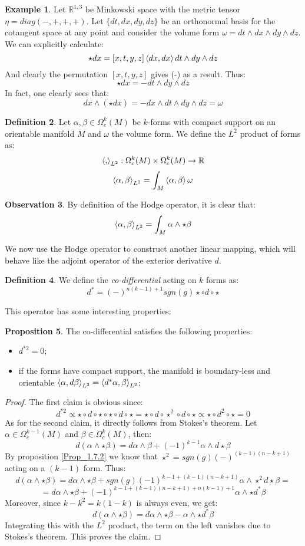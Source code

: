 \documentclass[12pt,a4paper]{report}
\theoremstyle{definition}
\newtheorem{Def}{Definition}[chapter]
\theoremstyle{Theorem}
\newtheorem{Prop}[Def]{Proposition}
\theoremstyle{definition}
\newtheorem{Ex}[Def]{Example}
\theoremstyle{definition}
\newtheorem{Obs}[Def]{Observation}
\begin{document}
	\begin{Ex}
		Let $\mathbb{R}^{1,3}$ be Minkowski space with the metric tensor $\eta=diag(-,+,+,+)$. Let $\{dt,dx,dy,dz\}$ be an orthonormal basis for the cotangent space at any point and consider the volume form $\omega=dt\wedge dx\wedge dy\wedge dz$. We can explicitly calculate:
		$$\star dx=[x,t,y,z]\braket{dx,dx}dt\wedge dy\wedge dz$$
		And clearly the permutation $[x,t,y,z]$ gives (-) as a result. Thus:
		$$\star dx=-dt\wedge dy\wedge dz$$
		In fact, one clearly sees that:
		$$dx\wedge (\star dx)=-dx\wedge dt\wedge dy\wedge dz=\omega$$
	\end{Ex}
	\begin{Def}\label{Def_1.10.2}
		Let $\alpha,\beta\in\Omega^k_c(M)$ be $k$-forms with compact support on an orientable manifold $M$ and $\omega$ the volume form. We define the $L^2$ product of forms as:
		$$\braket{,}_{L^2}:\Omega^k_c(M)\times \Omega^k_c(M)\rightarrow \mathbb{R}$$
		$$\braket{\alpha,\beta}_{L^2}=\int_M\braket{\alpha,\beta}\omega$$
	\end{Def}
	\begin{Obs}
		By definition of the Hodge operator, it is clear that:
		$$\braket{\alpha,\beta}_{L^2}=\int_M\alpha\wedge\star\beta$$
	\end{Obs}
	We now use the Hodge operator to construct another linear mapping, which will behave like the adjoint operator of the exterior derivative $d$.
	\begin{Def}
		We define the \textit{co-differential} acting on $k$ forms as:
		$$d^*=(-)^{n(k-1)+1}sgn(g)\star \circ  d\circ\star$$
	\end{Def}
	This operator has some interesting properties:
	\begin{Prop}
		The co-differential satisfies the following properties:
		\begin{itemize}
			\item $d^{*2}=0$;
			\item if the forms have compact support, the manifold is boundary-less and orientable $\braket{\alpha,d\beta}_{L^2}=\braket{d^*\alpha,\beta}_{L^2}$;
		\end{itemize}
	\end{Prop}
	\begin{proof}
		The first claim is obvious since:
		$$d^{*2}\propto\star \circ  d\circ\star\circ\star \circ  d\circ\star=\star \circ  d\circ\star^2\circ  d\circ\star\propto\star\circ d^2\circ\star=0$$
		As for the second claim, it directly follows from Stokes's theorem. Let $\alpha\in\Omega^{k-1}_c(M)$ and $\beta\in\Omega^{k}_c(M)$, then:
		$$d(\alpha\wedge \star\beta)=d\alpha\wedge\beta+(-1)^{k-1}\alpha\wedge d\star\beta$$
		By proposition \ref{Prop_1.7.2} we know that $\star^2=sgn(g)(-)^{(k-1)(n-k+1)}$ acting on a $(k-1)$ form. Thus:
		$$d(\alpha\wedge \star\beta)=
		d\alpha\wedge\star\beta+sgn(g)(-1)^{k-1+(k-1)(n-k+1)}\alpha\wedge \star^2 d\star\beta=$$
		$$=d\alpha\wedge\star\beta+(-1)^{k-1+(k-1)(n-k+1)+n(k-1)+1}\alpha\wedge \star d^*\beta$$
		Moreover, since $k-k^2=k(1-k)$ is always even, we get:
		$$d(\alpha\wedge \star\beta)=d\alpha\wedge \star\beta-\alpha\wedge \star d^*\beta$$
		Integrating this with the $L^2$ product, the term on the left vanishes due to Stokes's theorem. This proves the claim.
	\end{proof}
\end{document}
